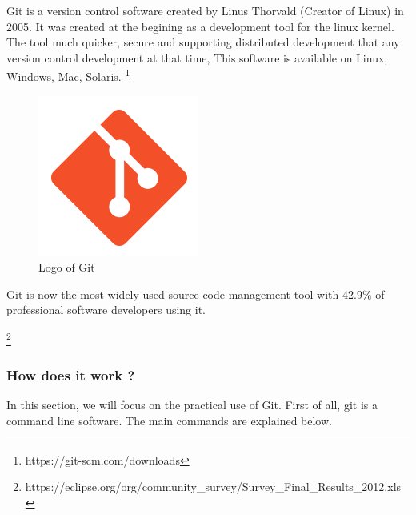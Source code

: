 \documentclass[a4paper]{report}
\begin{document}
Git is a version control software created by Linus Thorvald (Creator of Linux) in 2005. It was created at the begining as a development tool for the linux kernel. The tool much quicker, secure and supporting distributed development that any version control development at that time, 
This software is available on Linux, Windows, Mac, Solaris. \footnote{https://git-scm.com/downloads} \\

\begin{figure}[H]
	\centering
	\includegraphics[width=0.2\linewidth]{image/git.png}
	\caption{Logo of Git}
	\label{fig:git_logo}
\end{figure}

Git is now the most widely used source code management tool with 42.9\% of professional software developers using it.

\footnote{https://eclipse.org/org/community\_survey/Survey\_Final\_Results\_2012.xls}

\subsubsection{How does it work ?}

In this section, we will focus on the practical use of Git. First of all, git is a command line software. The main commands are explained below. 
\\
\end{document}
